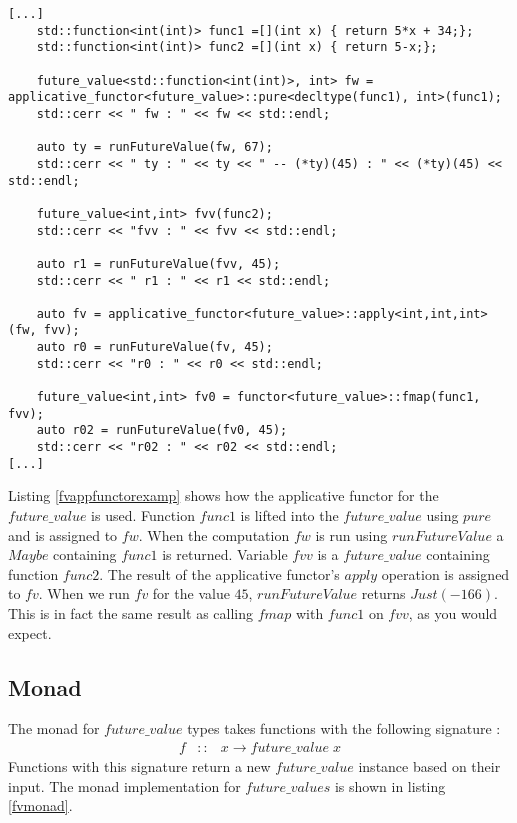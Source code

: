 \documentclass[12pt,fleqn]{article}
\begin{document}
\begin{minipage}{\linewidth}
\begin{lstlisting}[caption=Example of the applicative functor for the future value ,label=fvappfunctorexamp]
[...]
	std::function<int(int)> func1 =[](int x) { return 5*x + 34;};
	std::function<int(int)> func2 =[](int x) { return 5-x;};

	future_value<std::function<int(int)>, int> fw = applicative_functor<future_value>::pure<decltype(func1), int>(func1);
	std::cerr << " fw : " << fw << std::endl;

	auto ty = runFutureValue(fw, 67);
	std::cerr << " ty : " << ty << " -- (*ty)(45) : " << (*ty)(45) << std::endl;
	
	future_value<int,int> fvv(func2);	
	std::cerr << "fvv : " << fvv << std::endl;

	auto r1 = runFutureValue(fvv, 45);
	std::cerr << " r1 : " << r1 << std::endl;

	auto fv = applicative_functor<future_value>::apply<int,int,int>(fw, fvv);
	auto r0 = runFutureValue(fv, 45);
	std::cerr << "r0 : " << r0 << std::endl;

    future_value<int,int> fv0 = functor<future_value>::fmap(func1, fvv); 
	auto r02 = runFutureValue(fv0, 45);
	std::cerr << "r02 : " << r02 << std::endl;
[...]
\end{lstlisting}
\end{minipage}

Listing \ref{fvappfunctorexamp} shows how the applicative functor for the $future\_value$ is used.
Function $func1$ is lifted into the $future\_value$ using $pure$ and is assigned to $fw$.
When the computation $fw$ is run using $runFutureValue$ a $Maybe$ containing $func1$ is returned.
Variable $fvv$ is a $future\_value$ containing function $func2$.
The result of the applicative functor's $apply$ operation is assigned to $fv$.
When we run $fv$ for the value $45$, $runFutureValue$ returns $Just (-166)$.
This is in fact the same result as calling $fmap$ with $func1$ on $fvv$, as you would expect. 



\subsection{Monad}

The monad for $future\_value$ types takes functions with the following signature :
\begin{eqnarray*}
f &::& x \rightarrow future\_value\;x
\end{eqnarray*}
Functions with this signature return a new $future\_value$ instance based on their input.
The monad implementation for $future\_values$ is shown in listing \ref{fvmonad}.
\end{document}
